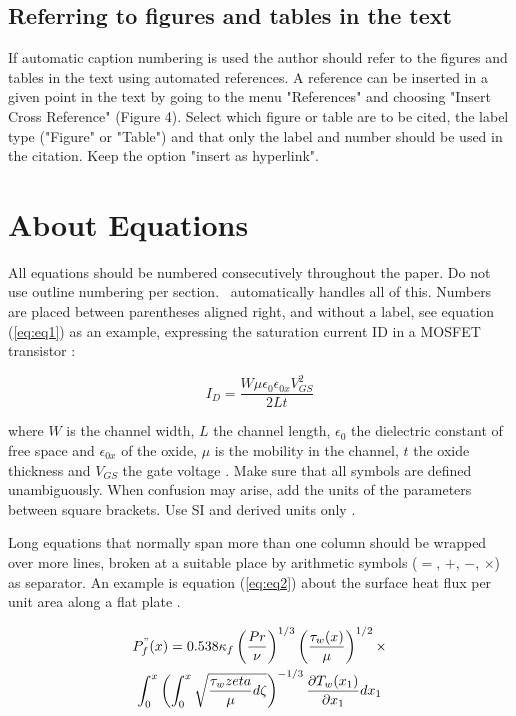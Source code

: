 \documentclass[10pt]{../imeko_acta}
\begin{document}
\subsection{Referring to figures and tables in the text}\label{sec:reffig}

If automatic caption numbering is used the author should refer to the figures and tables in the text using automated references. A reference can be inserted in a given point in the text by going to the menu "References" and choosing "Insert Cross Reference" (Figure 4). Select which figure or table are to be cited, the label type ("Figure" or "Table") and that only the label and number should be used in the citation. Keep the option "insert as hyperlink". 

\section{About Equations}

All equations should be numbered consecutively throughout the paper. Do not use outline numbering per section. \LaTeXe\ automatically handles all of this. Numbers are placed between parentheses aligned right, and without a label, see equation (\ref{eq:eq1}) as an example, expressing the saturation current ID in a MOSFET transistor \cite{Middelhoek1989}:

\begin{equation}\label{eq:eq1}
I_D = \frac{W \mu \epsilon_0 \epsilon_{0x} V^2_{GS}}{2Lt}
\end{equation}

where $W$ is the channel width, $L$ the channel length, $\epsilon_0$ the dielectric constant of free space and $\epsilon_{0x}$ of the oxide, $\mu$ is the mobility in the channel, $t$ the oxide thickness and $V_{GS}$ the gate voltage \cite{Middelhoek1989}. Make sure that all symbols are defined unambiguously. When confusion may arise, add the units of the parameters between square brackets. Use SI and derived units only \cite{Grattan1994}. 

Long equations that normally span more than one column should be wrapped over more lines, broken at a suitable place by arithmetic symbols ($=$, $+$, $-$, $\times$) as separator. An example is equation  (\ref{eq:eq2}) about the surface heat flux per unit area along a flat plate \cite{Lighthill1950}.

\begin{multline}\label{eq:eq2}
P^{"}_f(x) = 0.538\kappa_f \left(\frac{Pr}{\nu}\right)^{1/3}\left(\frac{\tau_w(x)}{\mu}\right)^{1/2} \times \\
\int_{0}^{x} \left(\int_{0}^{x}\sqrt{\frac{\tau_w{zeta}}{\mu}d\zeta} \right)^{-1/3} \frac{\partial T_w(x_1)}{\partial x_1}dx_1
\end{multline}
\end{document}
